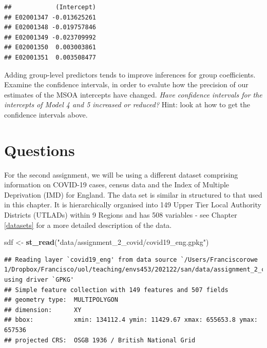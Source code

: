 \documentclass[
]{book}
\newenvironment{Shaded}{\begin{snugshade}}{\end{snugshade}}
\newcommand{\CommentTok}[1]{\textcolor[rgb]{0.56,0.35,0.01}{\textit{#1}}}
\newcommand{\DecValTok}[1]{\textcolor[rgb]{0.00,0.00,0.81}{#1}}
\newcommand{\KeywordTok}[1]{\textcolor[rgb]{0.13,0.29,0.53}{\textbf{#1}}}
\newcommand{\NormalTok}[1]{#1}
\newcommand{\OperatorTok}[1]{\textcolor[rgb]{0.81,0.36,0.00}{\textbf{#1}}}
\newcommand{\StringTok}[1]{\textcolor[rgb]{0.31,0.60,0.02}{#1}}
\begin{document}
\begin{Shaded}
\end{Shaded}

\begin{verbatim}
##            (Intercept)
## E02001347 -0.013625261
## E02001348 -0.019757846
## E02001349 -0.023709992
## E02001350  0.003003861
## E02001351  0.003508477
\end{verbatim}

Adding group-level predictors tends to improve inferences for group coefficients. Examine the confidence intervals, in order to evalute how the precision of our estimates of the MSOA intercepts have changed. \emph{Have confidence intervals for the intercepts of Model 4 and 5 increased or reduced?} Hint: look at how to get the confidence intervals above.

\hypertarget{questions-3}{%
\section{Questions}\label{questions-3}}

For the second assignment, we will be using a different dataset comprising information on COVID-19 cases, census data and the Index of Multiple Deprivation (IMD) for England. The data set is similar in structured to that used in this chapter. It is hierarchically organised into 149 Upper Tier Local Authority Districts (UTLADs) within 9 Regions and has 508 variables - see Chapter \ref{datasets} for a more detailed description of the data.

\begin{Shaded}
\begin{Highlighting}[]
\NormalTok{sdf <-}\StringTok{ }\KeywordTok{st_read}\NormalTok{(}\StringTok{"data/assignment_2_covid/covid19_eng.gpkg"}\NormalTok{)}
\end{Highlighting}
\end{Shaded}

\begin{verbatim}
## Reading layer `covid19_eng' from data source `/Users/Franciscorowe 1/Dropbox/Francisco/uol/teaching/envs453/202122/san/data/assignment_2_covid/covid19_eng.gpkg' using driver `GPKG'
## Simple feature collection with 149 features and 507 fields
## geometry type:  MULTIPOLYGON
## dimension:      XY
## bbox:           xmin: 134112.4 ymin: 11429.67 xmax: 655653.8 ymax: 657536
## projected CRS:  OSGB 1936 / British National Grid
\end{verbatim}
\end{document}
